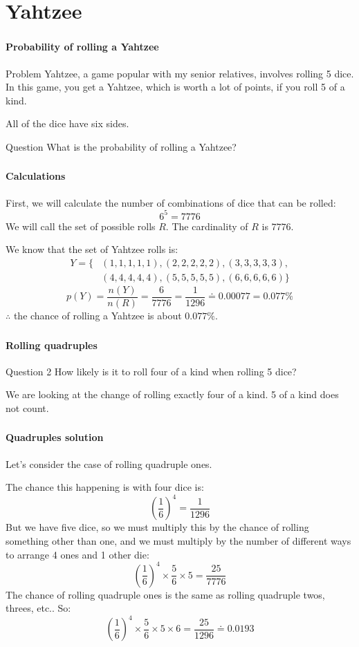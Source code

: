 \documentclass[mathserif]{beamer}
\newenvironment{namedframe}[1]%
	{\begin{frame}\frametitle{\secname}\framesubtitle{#1}}
	{\end{frame}}
\begin{document}
	\section{Yahtzee}
	\begin{namedframe}{Probability of rolling a Yahtzee}
		\begin{exampleblock}{Problem}
			Yahtzee, a game popular with my senior relatives, involves rolling 5 dice. In this game, you get a Yahtzee, which is worth a lot of points, if you roll 5 of a kind.

			All of the dice have six sides.
		\end{exampleblock}
		\begin{exampleblock}{Question}
			What is the probability of rolling a Yahtzee?
		\end{exampleblock}
	\end{namedframe}
	\begin{namedframe}{Calculations}
		First, we will calculate the number of combinations of dice that can be rolled:
		\pause
		\[6^5 = 7776\]
		We will call the set of possible rolls $R$. The cardinality of $R$ is $7776$.
		\pause

		We know that the set of Yahtzee rolls is:
		\begin{align*}
			Y = \{&(1,1,1,1,1), (2,2,2,2,2), (3,3,3,3,3),\\
			      &(4,4,4,4,4), (5,5,5,5,5), (6,6,6,6,6)\}
		\end{align*}
		\pause
		\[p(Y) = \frac{n(Y)}{n(R)} = \frac{6}{7776} = \frac{1}{1296} \doteq 0.00077 = 0.077\%\]
		$\therefore$ the chance of rolling a Yahtzee is about $0.077\%$.
	\end{namedframe}
	\begin{namedframe}{Rolling quadruples}
		\begin{exampleblock}{Question 2}
			How likely is it to roll four of a kind when rolling 5 dice?
		\end{exampleblock}
		We are looking at the change of rolling \alert{exactly} four of a kind. 5 of a kind does \alert{not} count.
	\end{namedframe}
	\begin{namedframe}{Quadruples solution}
		Let's consider the case of rolling quadruple ones.
		\pause

		The chance this happening is with four dice is:
		\[\left(\frac{1}{6}\right)^4 = \frac{1}{1296}\]
		\pause
		But we have five dice, so we must multiply this by the chance of rolling something other than one, and we must multiply by the number of different ways to arrange 4 ones and 1 other die:
		\[\left(\frac{1}{6}\right)^4 \times \frac{5}{6} \times 5 = \frac{25}{7776}\]
		\pause
		The chance of rolling quadruple ones is the same as rolling quadruple twos, threes, etc.. So:
		\[\left(\frac{1}{6}\right)^4 \times \frac{5}{6} \times 5 \times 6 = \frac{25}{1296} \doteq 0.0193\]
	\end{namedframe}
\end{document}
